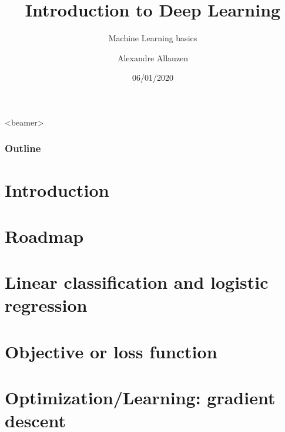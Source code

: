 \documentclass[10pt]{beamer}
\title[IDL@ESPCI] %
{Introduction to Deep Learning}
\subtitle{Machine Learning basics}
\author[A. Allauzen] %
{Alexandre Allauzen}
\institute[ESPCI/Dauphine/PSL] %
{
\texttt{[image: ../logos/espci\_blue.png]}\hfill
\raisebox{1.75ex}{\texttt{[image: ../logos/dauphine.png]}}\\
\hfill\texttt{[image: ../logos/logomiles\_white.pdf]}
}
\date{06/01/2020} %
\begin{document}

\begin{frame}
  \titlepage
\end{frame}

  \begin{frame}<beamer>
    \frametitle{Outline}
    \tableofcontents
  \end{frame}
 


  
  
 
  
\section{Introduction}


\section{Roadmap}



\section{Linear classification and logistic regression}


\section{Objective or loss function}


%

\section{Optimization/Learning: gradient descent}

\end{document}
